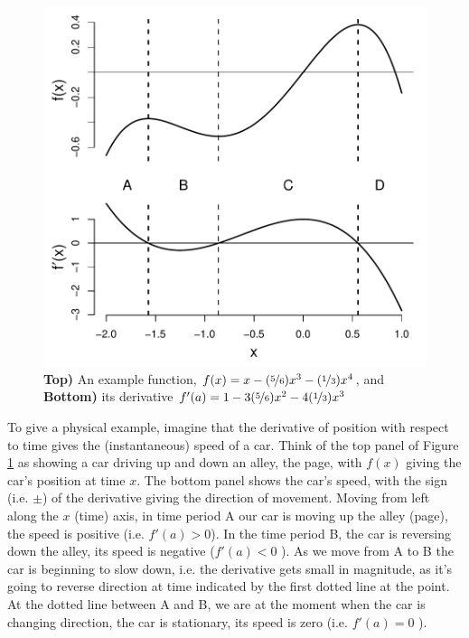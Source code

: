 \begin{figure}
 \begin{center}
   \includegraphics[width=0.7 \textwidth]{math_background/calc_pics/Derivat.pdf}\end{center}
 \caption{{\bf Top)} An example function, $f(x) = x -(\nicefrac{5}{6})x^3  -
   (\nicefrac{1}{3}) x^4$, and {\bf Bottom)} its derivative $f'(a) = 1 - 3(\nicefrac{5}{6}) x^2 -4 (\nicefrac{1}{3}) x^3$
   }\label{Fig:derivative}
\end{figure}
To give a physical example, imagine that the derivative of position with respect to
time gives the (instantaneous) speed of a car. Think of the top panel of Figure \ref{Fig:derivative}
as showing a car driving up and down an
alley, the page, with $f(x)$ giving the car's position at time $x$. The bottom panel
shows the car's speed, with the sign (i.e. $\pm$) of the derivative giving the direction of
movement. Moving from left along the $x$ (time) axis, in time period A our car is moving up the alley (page), the speed is
positive (i.e. $f'(a)>0$). In the time period B, the car is reversing down the alley, its speed is negative ($f'(a)<0$ ).  
As we move from A to B the car is beginning to slow down, i.e. the derivative gets small
in magnitude, as it's going to reverse direction at time indicated by
the first dotted line at the point. At the
dotted line between A and B, we are at the moment when the car is changing direction, the car is
stationary, its speed is zero (i.e. $f'(a)=0$ ). 

